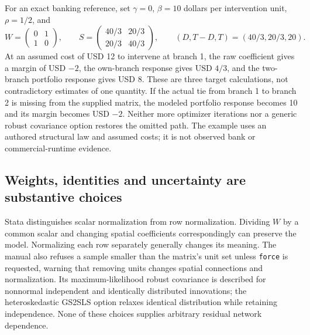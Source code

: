 For an exact banking reference, set $\gamma=0$, $\beta=10$ dollars per
intervention unit, $\rho=1/2$, and
\begin{equation}
 W=\begin{pmatrix}0&1\\1&0\end{pmatrix},\qquad
 S=\begin{pmatrix}40/3&20/3\\20/3&40/3\end{pmatrix},\qquad
 (D,T-D,T)=(40/3,20/3,20).
 \label{exec20:network-feedback}
\end{equation}
At an assumed cost of USD 12 to intervene at branch 1, the raw coefficient
gives a margin of USD $-2$, the own-branch response gives USD $4/3$, and the
two-branch portfolio response gives USD 8. These are three target calculations,
not contradictory estimates of one quantity. If the actual tie from branch 1
to branch 2 is missing from the supplied matrix, the modeled portfolio response
becomes 10 and its margin becomes USD $-2$. Neither more optimizer iterations
nor a generic robust covariance option restores the omitted path. The example
uses an authored structural law and assumed costs; it is not observed bank or
commercial-runtime evidence. \citep{exec20_network_reference}

\subsection{Weights, identities and uncertainty are substantive choices}
\label{exec20:network-weights}

Stata distinguishes scalar normalization from row normalization. Dividing $W$
by a common scalar and changing spatial coefficients correspondingly can
preserve the model. Normalizing each row separately generally changes its
meaning. The manual also refuses a sample smaller than the matrix's unit set
unless \texttt{force} is requested, warning that removing units changes spatial
connections and normalization. Its maximum-likelihood robust covariance is
described for nonnormal independent and identically distributed innovations;
the heteroskedastic GS2SLS option relaxes identical distribution while retaining
independence. None of these choices supplies arbitrary residual network
dependence. \citep{exec20_network_stata_spregress}

